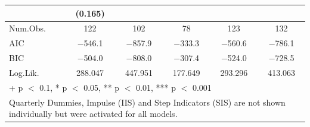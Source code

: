 \begin{table}
{\begin{tabular}[t]{lccccc}
 & (\num{0.165}) &  &  &  & \\
\midrule
Num.Obs. & \num{122} & \num{102} & \num{78} & \num{123} & \num{132}\\
AIC & \num{-546.1} & \num{-857.9} & \num{-333.3} & \num{-560.6} & \num{-786.1}\\
BIC & \num{-504.0} & \num{-808.0} & \num{-307.4} & \num{-524.0} & \num{-728.5}\\
Log.Lik. & \num{288.047} & \num{447.951} & \num{177.649} & \num{293.296} & \num{413.063}\\
\bottomrule
\multicolumn{6}{l}{\rule{0pt}{1em}+ p $<$ 0.1, * p $<$ 0.05, ** p $<$ 0.01, *** p $<$ 0.001}\\
\multicolumn{6}{l}{\rule{0pt}{1em}Quarterly Dummies, Impulse (IIS) and Step Indicators (SIS) are not shown individually but were activated for all models.}\\
\end{tabular}}
\end{table}
